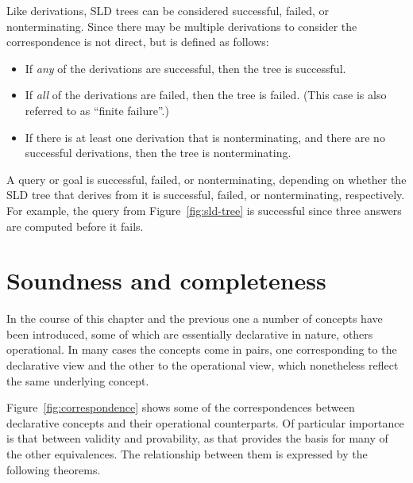 Like derivations,
SLD trees can be considered successful, failed, or nonterminating.
Since there may be multiple derivations to consider
the correspondence is not direct,
but is defined as follows:
\begin{itemize}
\item
If \emph{any} of the derivations are successful,
then the tree is successful\label{gi:success2}.
\item
If \emph{all} of the derivations are failed,
then the tree is failed\label{gi:failure2}.
(This case is also referred to as ``finite failure''.)
\item
If there is at least one derivation that is nonterminating,
and there are no successful derivations,
then the tree is nonterminating\label{gi:nontermination2}.
\end{itemize}
A query or goal is successful, failed, or nonterminating,
depending on whether the SLD tree that derives from it
is successful, failed, or nonterminating,
respectively.
For example,
the query from Figure~\ref{fig:sld-tree}
is successful since three answers are computed
before it fails.


\section{Soundness and completeness}
\label{sec:meta}

In the course of this chapter and the previous one
a number of concepts have been introduced,
some of which are essentially declarative in nature,
others operational.
In many cases the concepts come in pairs,
one corresponding to the declarative view
and the other to the operational view,
which nonetheless reflect the same underlying concept.

Figure~\ref{fig:correspondence} shows some of the correspondences
between declarative concepts and their operational counterparts.
Of particular importance is that between validity and provability,
as that provides the basis for many of the other equivalences.
The relationship between them
is expressed by the following theorems.

